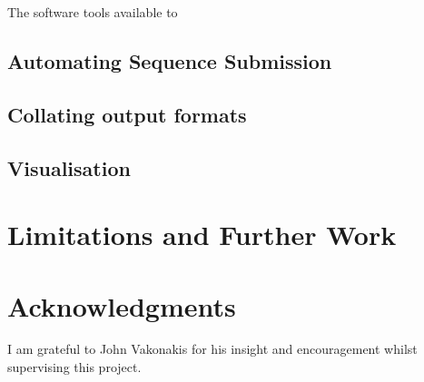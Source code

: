 \documentclass[fleqn,10pt]{article} %
\begin{document}
The software tools available to 



\subsection{Automating Sequence Submission}


\subsection{Collating output formats}


\subsection{Visualisation}


\section{Limitations and Further Work}

\section*{Acknowledgments}

I am grateful to John Vakonakis for his insight and encouragement whilst supervising this project.





\end{document}
